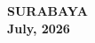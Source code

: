   \vspace{4ex}

  \begin{center}
    \textbf{SURABAYA} \\
    \textbf{July, 2026}
  \end{center}
\endgroup
